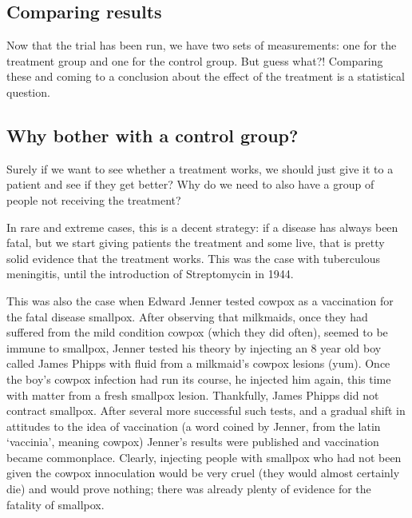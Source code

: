 \documentclass[
  openany]{book}
\theoremstyle{definition}
\theoremstyle{definition}
\theoremstyle{definition}
\theoremstyle{definition}
\theoremstyle{remark}
\begin{document}
\hypertarget{comparing-results}{%
\subsection*{Comparing results}\label{comparing-results}}

Now that the trial has been run, we have two sets of measurements: one for the treatment group and one for the control group. But guess what?! Comparing these and coming to a conclusion about the effect of the treatment is a statistical question.

\hypertarget{why-bother-with-a-control-group}{%
\subsection*{Why bother with a control group?}\label{why-bother-with-a-control-group}}

Surely if we want to see whether a treatment works, we should just give it to a patient and see if they get better? Why do we need to also have a group of people not receiving the treatment?

In rare and extreme cases, this is a decent strategy: if a disease has always been fatal, but we start giving patients the treatment and some live, that is pretty solid evidence that the treatment works. This was the case with tuberculous meningitis, until the introduction of Streptomycin in 1944.

This was also the case when Edward Jenner tested cowpox as a vaccination for the fatal disease smallpox. After observing that milkmaids, once they had suffered from the mild condition cowpox (which they did often), seemed to be immune to smallpox, Jenner tested his theory by injecting an 8 year old boy called James Phipps with fluid from a milkmaid's cowpox lesions (yum). Once the boy's cowpox infection had run its course, he injected him again, this time with matter from a fresh smallpox lesion. Thankfully, James Phipps did not contract smallpox. After several more successful such tests, and a gradual shift in attitudes to the idea of vaccination (a word coined by Jenner, from the latin `vaccinia', meaning cowpox) Jenner's results were published and vaccination became commonplace. Clearly, injecting people with smallpox who had not been given the cowpox innoculation would be very cruel (they would almost certainly die) and would prove nothing; there was already plenty of evidence for the fatality of smallpox.
\end{document}
